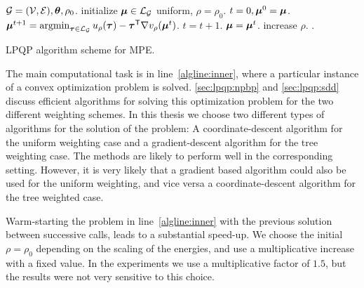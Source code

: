 \begin{algorithm}[htb]
\begin{algorithmic}[1]
    \REQUIRE $\mathcal{G} = (\mathcal{V},\mathcal{E}), \bm{\theta}, \rho_0$.
    \STATE initialize $\bm{\mu} \in \mathcal{L}_{\mathcal{G}}$
    uniform, $\rho = \rho_0$.
    \REPEAT
        \STATE $t = 0, \bm{\mu}^{0}=\bm{\mu}$.
        \REPEAT
            \STATE $\marginalvarv^{t+1} =
            \argmin_{\bm{\tau}\in\localmarginalpolytope_{\gmgraph}}
            u_{\rho}(\bm{\tau}) -  \bm{\tau}^{\transpose} \nabla v_{\rho}(\marginalvarv^{t})$.
	    \label{algline:inner}
            \STATE $t = t+1$.
        \STATE $\bm{\mu} = \bm{\mu}^{t}$.
        \STATE increase $\rho$.
    \RETURN{$\marginalvarv$}.
\end{algorithmic}
\caption{\ac{LPQP} algorithm scheme for \ac{MPE}.}
\label{alg:lpqp:lpqp}
\end{algorithm}
The main computational task is in line~\ref{algline:inner}, where a particular instance of 
a convex optimization problem is solved. \autoref{sec:lpqp:npbp} and
\autoref{sec:lpqp:sdd} discuss efficient algorithms for solving this
optimization problem for the two different weighting schemes. In this thesis
we choose two different types of algorithms for the solution of the problem:
A coordinate-descent algorithm for the uniform weighting case and a
gradient-descent algorithm for the tree weighting case. The methods are
likely to perform well in the corresponding setting.
However, it is very likely that a gradient based algorithm could also be used
for the uniform weighting, and vice versa a coordinate-descent algorithm for
the tree weighted case.

Warm-starting the problem in line~\ref{algline:inner} with the previous solution
between successive calls, leads to a substantial speed-up.
We choose the initial $\rho=\rho_0$ depending on the scaling of the energies, and use a
multiplicative increase with a fixed value.
In the experiments we use a multiplicative factor of $1.5$, but the results were 
not very sensitive to this choice.


